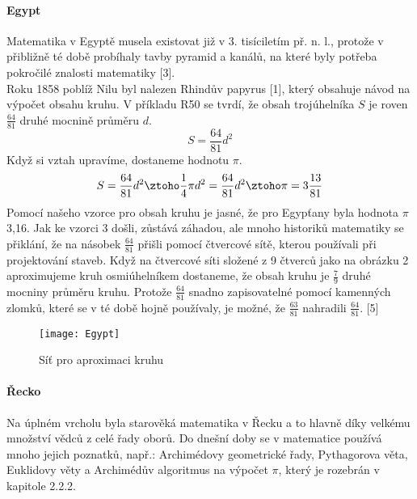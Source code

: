 \documentclass[rocnikovka]{gzwroc} %
\begin{document}
\paragraph{Egypt}
Matematika v Egyptě musela existovat již v 3. tisíciletím př. n. l., protože v přibližně té době probíhaly tavby pyramid a kanálů, na které byly potřeba pokročilé znalosti matematiky [3].\\
Roku 1858 poblíž Nilu byl nalezen Rhindův papyrus [1], který obsahuje návod na výpočet obsahu kruhu. V příkladu R50 se tvrdí, že obsah trojúhelníka $S$ je roven $\frac{64}{81}$ druhé mocnině průměru $d$.
\begin{equation}
S=\frac{64}{81}d^2
\end{equation}
Když si vztah upravíme, dostaneme hodnotu $\pi$.
$$
S=\frac{64}{81}d^2 \ztoho \frac{1}{4}\pi d^2=\frac{64}{81}d^2 \ztoho \pi=3\frac{13}{81}
$$
Pomocí našeho vzorce pro obsah kruhu je jasné, že pro Egypťany byla hodnota $\pi$ 3,16. Jak ke vzorci 3 došli, zůstává záhadou, ale mnoho historiků matematiky se přiklání, že na násobek $\frac{64}{81}$ přišli pomocí čtvercové sítě, kterou používali při projektování staveb. Když na čtvercové síti složené z 9 čtverců jako na obrázku 2 aproximujeme kruh osmiúhelníkem dostaneme, že obsah kruhu je $\frac{7}{9}$ druhé mocniny průměru kruhu. Protože $\frac{64}{81}$ snadno zapisovatelné pomocí kamenných zlomků, které se v té době hojně používaly, je možné, že $\frac{63}{81}$ nahradili $\frac{64}{81}$. [5]
\begin{figure}[!ht]
\texttt{[image: Egypt]}
\caption{Síť pro aproximaci kruhu}
\label{fig:kruh}
\end{figure}
\paragraph{Řecko}
Na úplném vrcholu byla starověká matematika v Řecku a to hlavně díky velkému množství vědců z celé řady oborů. Do dnešní doby se v matematice používá mnoho jejich poznatků, např.: Archimédovy geometrické řady, Pythagorova věta, Euklidovy věty a Archimédův algoritmus na výpočet $\pi$, který je rozebrán v kapitole 2.2.2.
\end{document}

